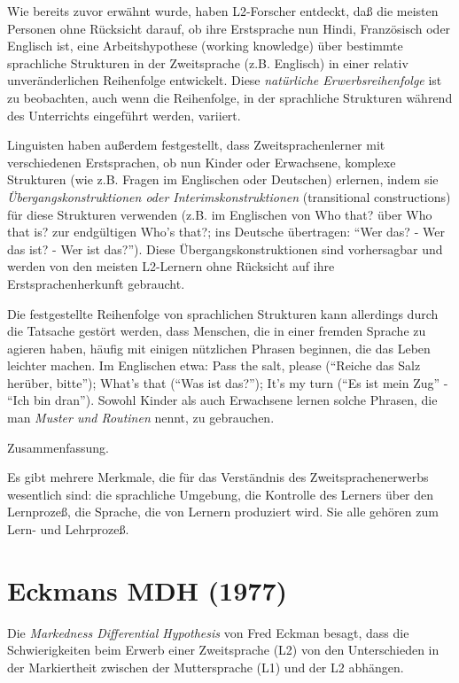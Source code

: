 \documentclass[
  letterpaper,
]{scrbook}
\begin{document}
Wie bereits zuvor erwähnt wurde, haben L2-Forscher entdeckt, daß die
meisten Personen ohne Rücksicht darauf, ob ihre Erstsprache nun Hindi,
Französisch oder Englisch ist, eine Arbeitshypothese (working knowledge)
über bestimmte sprachliche Strukturen in der Zweitsprache (z.B.
Englisch) in einer relativ unveränderlichen Reihenfolge entwickelt.
Diese \emph{natürliche Erwerbsreihenfolge} ist zu beobachten, auch wenn
die Reihenfolge, in der sprachliche Strukturen während des Unterrichts
eingeführt werden, variiert.

Linguisten haben außerdem festgestellt, dass Zweitsprachenlerner mit
verschiedenen Erstsprachen, ob nun Kinder oder Erwachsene, komplexe
Strukturen (wie z.B. Fragen im Englischen oder Deutschen) erlernen,
indem sie \emph{Übergangskonstruktionen oder Interimskonstruktionen}
(transitional constructions) für diese Strukturen verwenden (z.B. im
Englischen von Who that? über Who that is? zur endgültigen Who's that?;
ins Deutsche übertragen: ``Wer das? - Wer das ist? - Wer ist das?'').
Diese Übergangskonstruktionen sind vorhersagbar und werden von den
meisten L2-Lernern ohne Rücksicht auf ihre Erstsprachenherkunft
gebraucht.

Die festgestellte Reihenfolge von sprachlichen Strukturen kann
allerdings durch die Tatsache gestört werden, dass Menschen, die in
einer fremden Sprache zu agieren haben, häufig mit einigen nützlichen
Phrasen beginnen, die das Leben leichter machen. Im Englischen etwa:
Pass the salt, please (``Reiche das Salz herüber, bitte''); What's that
(``Was ist das?''); It's my turn (``Es ist mein Zug'' - ``Ich bin
dran''). Sowohl Kinder als auch Erwachsene lernen solche Phrasen, die
man \emph{Muster und Routinen} nennt, zu gebrauchen.

Zusammenfassung.

Es gibt mehrere Merkmale, die für das Verständnis des
Zweitsprachenerwerbs wesentlich sind: die sprachliche Umgebung, die
Kontrolle des Lerners über den Lernprozeß, die Sprache, die von Lernern
produziert wird. Sie alle gehören zum Lern- und Lehrprozeß.

\hypertarget{eckmans-mdh-1977}{%
\section{Eckmans MDH (1977)}\label{eckmans-mdh-1977}}

Die \emph{Markedness Differential Hypothesis} von Fred Eckman besagt,
dass die Schwierigkeiten beim Erwerb einer Zweitsprache (L2) von den
Unterschieden in der Markiertheit zwischen der Muttersprache (L1) und
der L2 abhängen.
\end{document}
